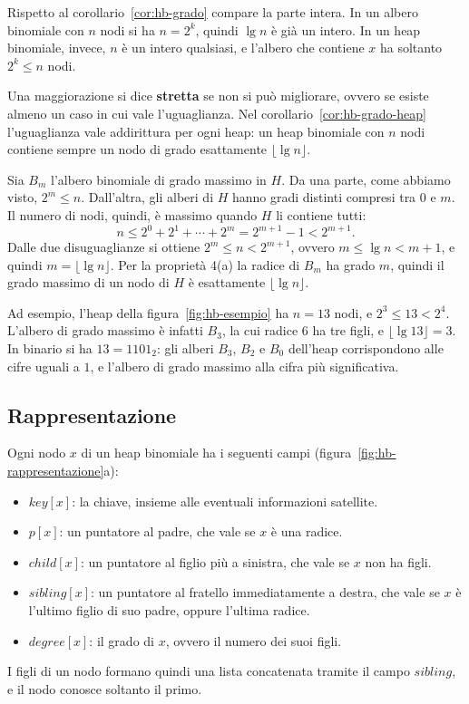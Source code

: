 Rispetto al corollario~\ref{cor:hb-grado} compare la parte intera. In un albero binomiale con $n$ nodi si ha $n = 2^k$, quindi $\lg n$ è già un intero. In un heap binomiale, invece, $n$ è un intero qualsiasi, e l'albero che contiene $x$ ha soltanto $2^k \le n$ nodi.

\begin{osservazione}\label{oss:hb-stretta}
Una maggiorazione si dice \textbf{stretta} se non si può migliorare, ovvero se esiste almeno un caso in cui vale l'uguaglianza. Nel corollario~\ref{cor:hb-grado-heap} l'uguaglianza vale addirittura per ogni heap: un heap binomiale con $n$ nodi contiene sempre un nodo di grado esattamente $\lfloor \lg n \rfloor$.

Sia $B_m$ l'albero binomiale di grado massimo in $H$. Da una parte, come abbiamo visto, $2^m \le n$. Dall'altra, gli alberi di $H$ hanno gradi distinti compresi tra $0$ e $m$. Il numero di nodi, quindi, è massimo quando $H$ li contiene tutti:
\[
n \le 2^0 + 2^1 + \cdots + 2^m = 2^{m+1} - 1 < 2^{m+1}.
\]
Dalle due disuguaglianze si ottiene $2^m \le n < 2^{m+1}$, ovvero $m \le \lg n < m + 1$, e quindi $m = \lfloor \lg n \rfloor$. Per la proprietà 4(a) la radice di $B_m$ ha grado $m$, quindi il grado massimo di un nodo di $H$ è esattamente $\lfloor \lg n \rfloor$.

Ad esempio, l'heap della figura~\ref{fig:hb-esempio} ha $n = 13$ nodi, e $2^3 \le 13 < 2^4$. L'albero di grado massimo è infatti $B_3$, la cui radice $6$ ha tre figli, e $\lfloor \lg 13 \rfloor = 3$. In binario si ha $13 = 1101_2$: gli alberi $B_3$, $B_2$ e $B_0$ dell'heap corrispondono alle cifre uguali a $1$, e l'albero di grado massimo alla cifra più significativa.
\end{osservazione}

\subsection{Rappresentazione}\label{sec:hb-rappresentazione}
Ogni nodo $x$ di un heap binomiale ha i seguenti campi (figura~\ref{fig:hb-rappresentazione}a):
\begin{itemize}
    \item $\mathit{key}[x]$: la chiave, insieme alle eventuali informazioni satellite.
    \item $p[x]$: un puntatore al padre, che vale \Nil{} se $x$ è una radice.
    \item $\mathit{child}[x]$: un puntatore al figlio più a sinistra, che vale \Nil{} se $x$ non ha figli.
    \item $\mathit{sibling}[x]$: un puntatore al fratello immediatamente a destra, che vale \Nil{} se $x$ è l'ultimo figlio di suo padre, oppure l'ultima radice.
    \item $\mathit{degree}[x]$: il grado di $x$, ovvero il numero dei suoi figli.
\end{itemize}
I figli di un nodo formano quindi una lista concatenata tramite il campo $\mathit{sibling}$, e il nodo conosce soltanto il primo.


